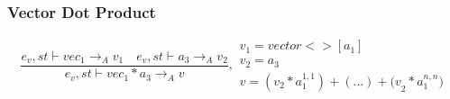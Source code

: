\subsubsection{Vector Dot Product}
\begin{equation}
	\frac { { e }_{ v },st\vdash { vec }_{ 1 }{ \rightarrow  }_{ A }{ v }_{ 1 }\quad { e }_{ v },st\vdash { a }_{ 3 }{ \rightarrow  }_{ A }{ v }_{ 2 } }{ { e }_{ v },st\vdash { vec }_{ 1 }\ast { a }_{ 3 }{ \rightarrow  }_{ A }{ v } } ,\begin{matrix} { v }_{ 1 }=vector<>[{ a }_{ 1 }] \\ { v }_{ 2 }={ a }_{ 3 } \\ v=({ v }_{ 2 }*{ a }_{ 1 }^{ 1,1 })+(...)+{ (v }_{ 2 }*{ a }_{ 1 }^{ n,n }) \end{matrix}
\end{equation}